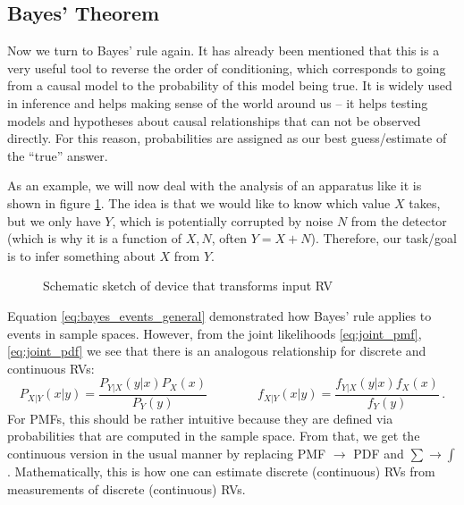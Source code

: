 	\subsection{Bayes' Theorem}
Now we turn to Bayes' rule again. It has already been mentioned that this is a very useful tool to reverse the order of conditioning, which corresponds to going from a causal model to the probability of this model being true. It is widely used in inference and helps making sense of the world around us -- it helps testing models and hypotheses about causal relationships that can not be observed directly. For this reason, probabilities are assigned as our best guess/estimate of the \enquote{true} answer.

As an example, we will now deal with the analysis of an apparatus like it is shown in figure \ref{fig:measure_device}. The idea is that we would like to know which value $X$ takes, but we only have $Y$, which is potentially corrupted by noise $N$ from the detector (which is why it is a function of $X, N$, often $Y = X + N$). Therefore, our task/goal is to infer something about $X$ from $Y$.\\



\begin{figure}[t]
\centering


\caption{Schematic sketch of device that transforms input RV}
\label{fig:measure_device}
\end{figure}



Equation \eqref{eq:bayes_events_general} demonstrated how Bayes' rule applies to events in sample spaces. However, from the joint likelihoods \eqref{eq:joint_pmf}, \eqref{eq:joint_pdf} we see that there is an analogous relationship for discrete and continuous RVs:
\begin{equation}
P_{X | Y}(x |  y) = \frac{P_{Y | X}(y | x) P_X(x)}{P_Y(y)} \qquad \qquad f_{X | Y}(x |  y) = \frac{f_{Y | X}(y | x) f_X(x)}{f_Y(y)} \, .
\end{equation}
For PMFs, this should be rather intuitive because they are defined via probabilities that are computed in the sample space. From that, we get the continuous version in the usual manner by replacing PMF $\rightarrow$ PDF and $\sum \rightarrow \int$. Mathematically, this is how one can estimate discrete (continuous) RVs from measurements of discrete (continuous) RVs.

